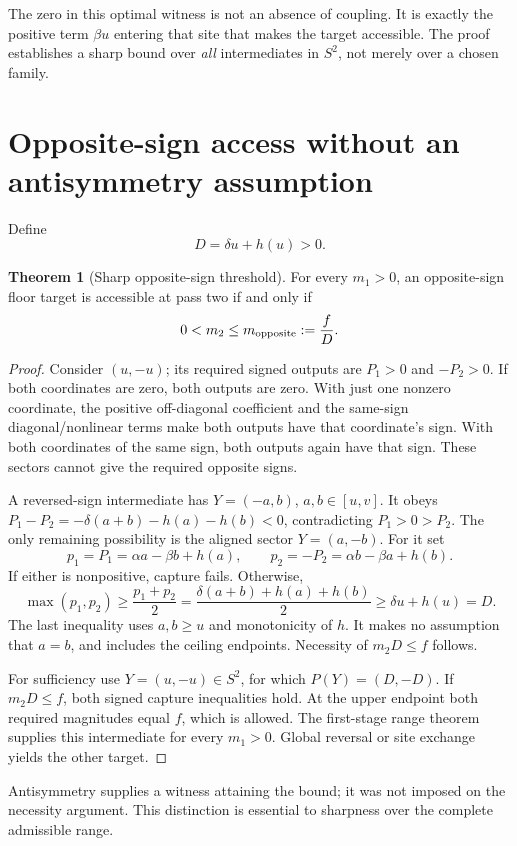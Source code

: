 \documentclass[11pt,a4paper]{article}
\theoremstyle{definition}
\newtheorem{theorem}{Theorem}[section]
\theoremstyle{remark}\newtheorem{remark}[theorem]{Remark}
\numberwithin{equation}{section}
\begin{document}
The zero in this optimal witness is not an absence of coupling. It is exactly
the positive term $\beta u$ entering that site that makes the target accessible.
The proof establishes a sharp bound over \emph{all} intermediates in $S^2$,
not merely over a chosen family.

\section{Opposite-sign access without an antisymmetry assumption}\label{sec:opposite}
Define
\begin{equation}\label{eq:D}
 D=\delta u+h(u)>0 .
\end{equation}
\begin{theorem}[Sharp opposite-sign threshold]\label{thm:opposite}
For every $m_1>0$, an opposite-sign floor target is accessible at pass two
if and only if
\begin{equation}\label{eq:mopp}
 0<m_2\leq m_{\rm opposite}:=\frac fD.
\end{equation}
\end{theorem}
\begin{proof}
Consider $(u,-u)$; its required signed outputs are $P_1>0$ and $-P_2>0$.
If both coordinates are zero, both outputs are zero.
With just one nonzero coordinate, the positive off-diagonal coefficient and the
same-sign diagonal/nonlinear terms make both outputs have that coordinate's sign.
With both coordinates of the same sign, both outputs again have that sign.
These sectors cannot give the required opposite signs.

A reversed-sign intermediate has $Y=(-a,b)$, $a,b\in[u,v]$. It obeys
$P_1-P_2=-\delta(a+b)-h(a)-h(b)<0$, contradicting $P_1>0>P_2$.
The only remaining possibility is the aligned sector $Y=(a,-b)$.
For it set
\[
 p_1=P_1=\alpha a-\beta b+h(a),\qquad
 p_2=-P_2=\alpha b-\beta a+h(b).
\]
If either is nonpositive, capture fails. Otherwise,
\begin{equation}\label{eq:average}
 \max(p_1,p_2)\geq\frac{p_1+p_2}{2}
 =\frac{\delta(a+b)+h(a)+h(b)}2
 \geq\delta u+h(u)=D.
\end{equation}
The last inequality uses $a,b\geq u$ and monotonicity of $h$.
It makes no assumption that $a=b$, and includes the ceiling endpoints.
Necessity of $m_2D\leq f$ follows.

For sufficiency use $Y=(u,-u)\in S^2$, for which $P(Y)=(D,-D)$.
If $m_2D\leq f$, both signed capture inequalities hold.
At the upper endpoint both required magnitudes equal $f$, which is allowed.
The first-stage range theorem supplies this intermediate for every $m_1>0$.
Global reversal or site exchange yields the other target.
\end{proof}
Antisymmetry supplies a witness attaining the bound; it was not imposed on the
necessity argument. This distinction is essential to sharpness over the complete
admissible range.
\end{document}
